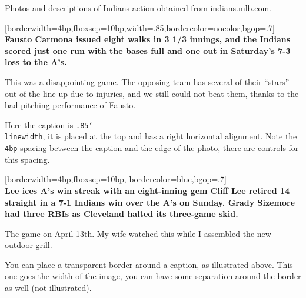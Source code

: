 \documentclass{article}
\newcommand{\cs}[1]{\texttt{\char`\\#1}}
\begin{document}
Photos and descriptions of Indians action obtained from \href{http://indians.mlb.com}{indians.mlb.com}.

\begin{center}
[borderwidth=4bp,fboxsep=10bp,width=.85\linewidth,bordercolor=nocolor,bgop=.7]%
    {\parskip6pt\bfseries\makebox[\linewidth][c]{\textcolor{webblue}
    {Free passes, missed chances hurt Tribe}}\\\relax\footnotesize Fausto Carmona
    issued eight walks in 3 1/3 innings, and the Indians scored just one
    run with the bases full and one out in Saturday's 7-3 loss to the
    A's.}
\end{center}

This was a disappointing game. The opposing team has
several of their ``stars'' out of the line-up due to injuries, and
we still could not beat them, thanks to the bad pitching performance
of Fausto.

Here the caption is \texttt{.85}\cs{linewidth}, it is placed at the
top and has a right horizontal alignment. Note the \texttt{4bp}
spacing between the caption and the edge of the photo, there are
controls for this spacing.

\begin{center}
[borderwidth=4bp,fboxsep=10bp,
    bordercolor=blue,bgop=.7]{\parskip6pt\bfseries
    \makebox[\linewidth]{\textcolor{webblue}{Lee ices A's win
    streak with an eight-inning gem}}\\\relax\footnotesize
    Lee ices A's win streak with an eight-inning gem Cliff Lee retired
    14 straight in a 7-1 Indians win over the A's on Sunday. Grady
    Sizemore had three RBIs as Cleveland halted its three-game skid.}%
\end{center}

The game on April 13th. My wife watched this while I assembled the new outdoor grill.

You can place a transparent border around a caption, as illustrated above. This one goes
the width of the image, you can have some separation around the border as well (not illustrated).


\newpage
\end{document}
